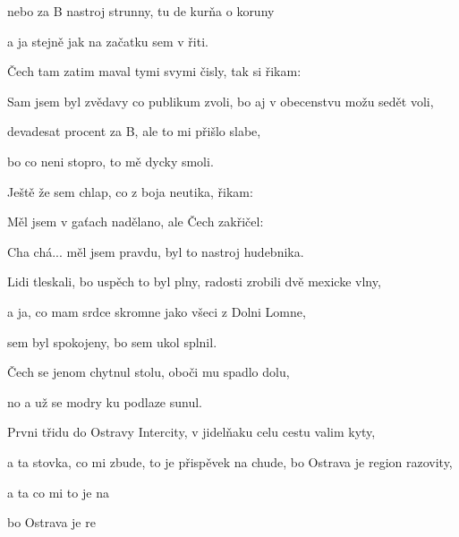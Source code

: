 nebo za B nastroj strunny, tu de kurňa o koruny

a ja stejně jak na začatku sem v řiti.
\ks

\zs
Čech tam zatim maval tymi svymi čisly, tak si řikam: 
\ks

\zs
Sam jsem byl zvědavy co publikum zvoli, bo aj v obecenstvu možu sedět voli,

devadesat procent za B, ale to mi přišlo slabe,

bo co neni stopro, to mě dycky smoli.
\ks

\zs
Ještě že sem chlap, co z boja neutika, řikam: 

Měl jsem v gaťach nadělano, ale Čech zakřičel: 

Cha chá... měl jsem pravdu, byl to nastroj hudebnika.
\ks

\zs
Lidi tleskali, bo uspěch to byl plny, radosti zrobili dvě mexicke vlny,

a ja, co mam srdce skromne jako všeci z Dolni Lomne,

sem byl spokojeny, bo sem ukol splnil.
\ks

\zs
{}

Čech se jenom chytnul stolu, oboči mu spadlo dolu,

no a už se modry ku podlaze sunul.
\ks

\zs
Prvni třidu do Ostravy Intercity, v jidelňaku celu cestu valim kyty,

a ta stovka, co mi zbude, to je přispěvek na chude, bo Ostrava je region razovity,

a ta  co mi  to je  na 

bo Ostrava je re 
\ks

\kp
